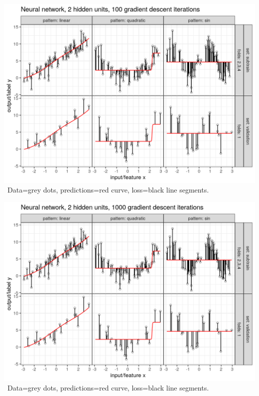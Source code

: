 \begin{frame}
  \includegraphics[width=\textwidth]{figure-overfitting-pred-units=2-maxit=100.png}
\ Data=grey dots, predictions=red curve, loss=black line segments.

\end{frame}


\begin{frame}
  \includegraphics[width=\textwidth]{figure-overfitting-pred-units=2-maxit=1000.png}
\ Data=grey dots, predictions=red curve, loss=black line segments.

\end{frame}


